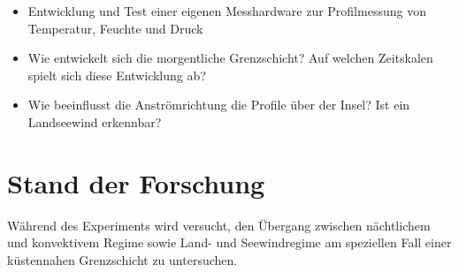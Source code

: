 \documentclass[a4paper,11pt,DIV=calc,tablecaptionabove,headinclude,twoside]{article}
\begin{document}
\begin{itemize}
\item Entwicklung und Test einer eigenen Messhardware zur Profilmessung von
    Temperatur, Feuchte und Druck
\item Wie entwickelt sich die morgentliche Grenzschicht? Auf welchen Zeitskalen spielt sich diese Entwicklung ab?
\item Wie beeinflusst die Anströmrichtung die Profile über der Insel? Ist ein
    Landseewind erkennbar?
\end{itemize}

\section{Stand der Forschung}
Während des Experiments wird versucht, den Übergang zwischen nächtlichem und konvektivem Regime sowie Land- und Seewindregime am speziellen Fall einer küstennahen Grenzschicht zu untersuchen.
 
\end{document}
